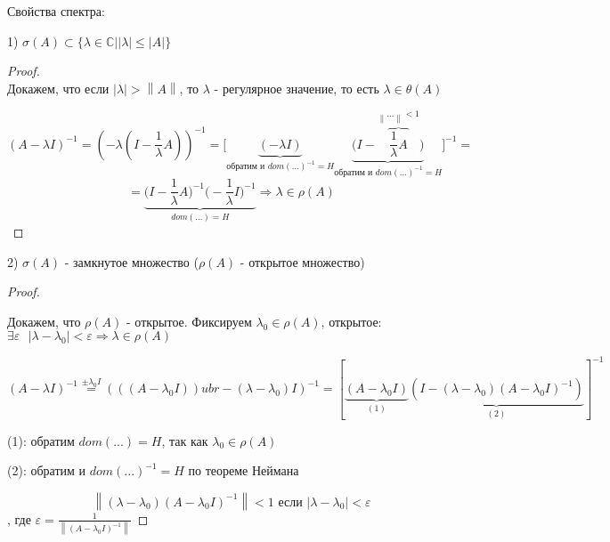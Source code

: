 \documentclass[12pt, a4paper]{report}
\begin{document}
Свойства спектра: 

1) \( \sigma (A ) \subset \{ \lambda \in  \mathbb{C} | \left\lvert  \lambda \right\rvert \le  \left\lvert A \right\rvert\} \) 

\begin{proof} \(   \)  \\

    Докажем, что если \( \left\lvert \lambda \right\rvert > \left\lVert A  \right\rVert \), то \( \lambda  \)  - регулярное значение, то есть \( \lambda \in  \theta (A) \) 

    \[ (A - \lambda I )^{-1 }  = \left( - \lambda \left( I - \frac{1}{\lambda }  A  \right) \right) ^{-1 }  = \bigg [\underbrace{ (- \lambda I )}_{\text{обратим и  } dom(... )^{-1 }  = H }\underbrace{ \bigg (I - \overbrace{\frac{1}{\lambda } A}^{\left\lVert ... \right\rVert <1} \bigg  )}_{\text{обратим и  } dom(... )^{-1 }  = H } \bigg ] ^{-1}=  \] 
    \[ = \underbrace{\bigg(  I -\frac{1}{\lambda } A      \bigg) ^{-1 }  \bigg(- \frac{1}{\lambda }I  \bigg) ^{-1 }}_{dom(... )= H}  \Rightarrow \lambda \in  \rho (A)\] 
\end{proof}

2) \( \sigma (A) \) - замкнутое множество (\(  \rho (A)\) - открытое множество)

\begin{proof} \(  \) 

    Докажем, что \( \rho (A) \) - открытое. Фиксируем \( \lambda_0 \in  \rho(A) \), открытое: \( \exists  \varepsilon \text{ }  \left\lvert \lambda - \lambda_0      \right\rvert < \varepsilon \Rightarrow \lambda \in  \rho(A)\) 

    \[ (A - \lambda I )^{-1 }  \overset{\pm \lambda_0 I}{=} (((A - \lambda_0 I ))ubr- (\lambda - \lambda_0 )I )^{-1} = [\underbrace{(A - \lambda_0 I )}_{(1)} \underbrace{(I - (\lambda - \lambda_0 ) (A - \lambda_0 I) ^{-1} )}_{(2)}]^{-1}  \]
    
    (1): обратим \( dom (... ) = H  \), так как \( \lambda_0 \in  \rho(A ) \) 

    (2): обратим и \( dom(... )^{-1 }  = H  \) по теореме Неймана

    \[ \left\lVert (\lambda- \lambda_0  ) ( A - \lambda_0 I )^{-1}  \right\rVert <1 \text{ если }  \left\lvert \lambda  -\lambda_0  \right\rvert < \varepsilon \] 
    , где \( \varepsilon = \displaystyle \frac{1}{ \left\lVert (A -\lambda_0 I )^{-1}  \right\rVert}  \) 

\end{proof}


\ifdefined\mainfile
\else
    
\end{document}
